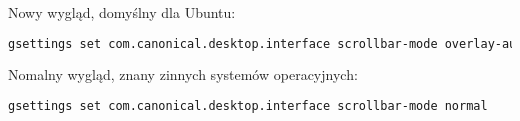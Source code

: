 Nowy wygląd, domyślny dla Ubuntu:

\begin{lstlisting}[language=bash]
gsettings set com.canonical.desktop.interface scrollbar-mode overlay-auto
\end{lstlisting}

Nomalny wygląd, znany  zinnych systemów operacyjnych:

\begin{lstlisting}[language=bash]
gsettings set com.canonical.desktop.interface scrollbar-mode normal
\end{lstlisting}